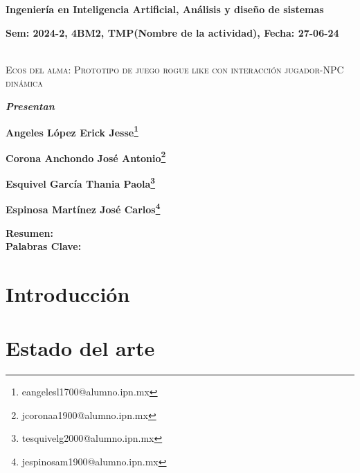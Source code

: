 \documentclass[12pt,twoside]{article}
\begin{document}
	
	\centerline{\bf Ingeniería en Inteligencia Artificial, Análisis y diseño de sistemas}
	
	\centerline{\bf Sem: 2024-2, 4BM2, TMP(Nombre de la actividad), Fecha: 27-06-24\\\\}
	
	\centerline{}
	
	
	
	\begin{center}
		\Large{\textsc{Ecos del alma: Prototipo de juego rogue like con interacción jugador-NPC dinámica}} 
	\end{center}
	\centerline{}
	\centerline{\bf {\textit{Presentan}}}
	\centerline{}
	\centerline{\bf {Angeles López Erick Jesse\footnote{eangelesl1700@alumno.ipn.mx}}}
	\centerline{\bf {Corona Anchondo José Antonio\footnote{jcoronaa1900@alumno.ipn.mx}}}
	\centerline{\bf {Esquivel García Thania Paola\footnote{tesquivelg2000@alumno.ipn.mx}}}
	\centerline{\bf {	Espinosa Martínez José Carlos\footnote{jespinosam1900@alumno.ipn.mx}}}
	
	
	
	\newtheorem{Theorem}{\quad Theorem}[section]
	
	\newtheorem{Definition}[Theorem]{\quad Definition}
	
	\newtheorem{Corollary}[Theorem]{\quad Corollary}
	
	\newtheorem{Lemma}[Theorem]{\quad Lemma}
	
	\newtheorem{Example}[Theorem]{\quad Example}
	
	\bigskip
	
	\bigskip
	
	\textbf{Resumen:}  \\ 
	
	{\bf Palabras Clave:} \\
	
	\clearpage
	
	\tableofcontents
		
	\clearpage
		
	\section{Introducción}
	
	\section{Estado del arte} %
	
\end{document}
